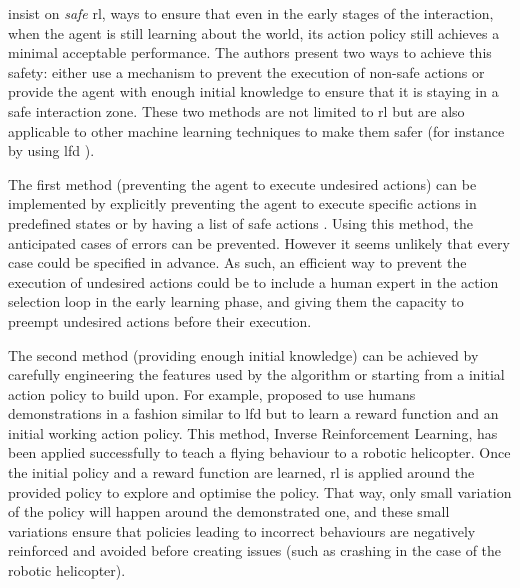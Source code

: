 	\cite{garcia2015comprehensive} insist on \textit{safe} \gls{rl}, ways to ensure that even in the early stages of the interaction, when the agent is still learning about the world, its action policy still achieves a minimal acceptable performance. The authors present two ways to achieve this safety: either use a mechanism to prevent the execution of non-safe actions or provide the agent with enough initial knowledge to ensure that it is staying in a safe interaction zone. These two methods are not limited to \gls{rl} but are also applicable to other machine learning techniques to make them safer (for instance by using \gls{lfd} \citealt{billard2008robot}). 
	
	The first method (preventing the agent to execute undesired actions) can be implemented by explicitly preventing the agent to execute specific actions in predefined states or by having a list of safe actions \citep{alshiekh2017safe}. Using this method, the anticipated cases of errors can be prevented. However it seems unlikely that every case could be specified in advance. As such, an efficient way to prevent the execution of undesired actions could be to include a human expert in the action selection loop in the early learning phase, and giving them the capacity to preempt undesired actions before their execution. 
	
	The second method (providing enough initial knowledge) can be achieved by carefully engineering the features used by the algorithm or starting from a initial action policy to build upon. For example, \cite{abbeel2004apprenticeship} proposed to use humans demonstrations in a fashion similar to \gls{lfd} but to learn a reward function and an initial working action policy. This method, Inverse Reinforcement Learning, has been applied successfully to teach a flying behaviour to a robotic helicopter. Once the initial policy and a reward function are learned, \gls{rl} is applied around the provided policy to explore and optimise the policy. That way, only small variation of the policy will happen around the demonstrated one, and these small variations ensure that policies leading to incorrect behaviours are negatively reinforced and avoided before creating issues (such as crashing in the case of the robotic helicopter). 
	
	
